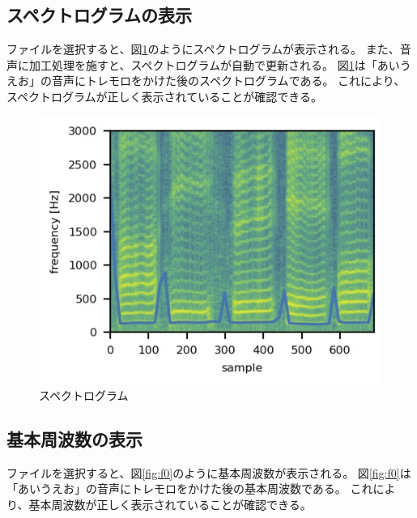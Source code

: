 \documentclass[a4paper,11pt]{jsarticle}
\begin{document}
\subsection{スペクトログラムの表示}

ファイルを選択すると、図\ref{fig:spectrogram}のようにスペクトログラムが表示される。
また、音声に加工処理を施すと、スペクトログラムが自動で更新される。
図\ref{fig:spectrogram}は「あいうえお」の音声にトレモロをかけた後のスペクトログラムである。
これにより、スペクトログラムが正しく表示されていることが確認できる。

\begin{figure}[h]
\centering
\includegraphics[keepaspectratio, width=13cm]
{./images/spec-tremolo.jpg}
\caption{スペクトログラム}
\label{fig:spectrogram}
\end{figure}

\subsection{基本周波数の表示}

ファイルを選択すると、図\ref{fig:f0}のように基本周波数が表示される。
図\ref{fig:f0}は「あいうえお」の音声にトレモロをかけた後の基本周波数である。
これにより、基本周波数が正しく表示されていることが確認できる。
\end{document}
